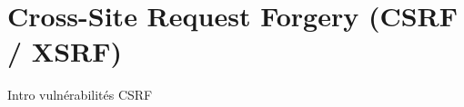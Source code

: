 

\newpage
\section{Cross-Site Request Forgery (CSRF / XSRF)}\label{vulnerabilites:web:csrf}

Intro vulnérabilités CSRF

\endinput
